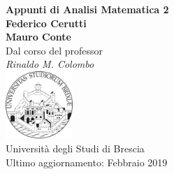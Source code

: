 \documentclass[a4paper,twoside,italian]{book}
\begin{document}
\pagestyle{headings}

\frontmatter
\begin{titlepage}
  \begin{center}
    {\huge\bfseries Appunti di Analisi Matematica 2\\}
    \vspace{1.5cm}
    {\Large\bfseries Federico Cerutti\\Mauro Conte\\}
    \vspace{2cm}
    {Dal corso del professor}\\[5pt]
    \emph{{Rinaldo M. Colombo}}\\[2cm]
    \vfill
    \includegraphics[width=0.19\textwidth]{unibs-logo.png}\\[5pt]
    {Università degli Studi di Brescia}\\[10pt]
    {Ultimo aggiornamento: Febbraio 2019}
  \end{center}
\end{titlepage}

\null\vfill
\doclicenseThis
\newpage

\tableofcontents


\mainmatter








\backmatter
\end{document}
